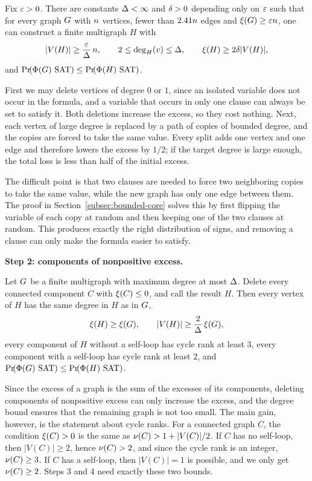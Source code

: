 \begin{lemma}\label{lem:overview-bounded-core}
Fix \(\varepsilon>0\). There are constants \(\Delta<\infty\) and \(\delta>0\)
depending only on \(\varepsilon\) such that for every graph \(G\) with
\(n\) vertices, fewer than \(2.41n\) edges and
\(\xi(G)\ge\varepsilon n\), one can construct a finite multigraph \(H\) with
\[
  |V(H)|\ge\frac{\varepsilon}{\Delta}\,n,
  \qquad
  2\le\deg_{H}(v)\le\Delta,
  \qquad
  \xi(H)\ge2\delta|V(H)|,
\]
and \(\Prx{\rform{\Gin}\SAT}\le\Prx{\rform{H}\SAT}\).
\end{lemma}

First we may delete vertices of degree \(0\) or \(1\), since an isolated
variable does not occur in the formula, and a variable that
occurs in only one clause can always be set to satisfy it. Both deletions
increase the excess, so they cost nothing. Next, each vertex of large degree is
replaced by a path of copies of bounded degree, and the copies are forced to
take the same value. Every split adds one vertex and one edge and therefore
lowers the excess by \(1/2\); if the target degree is large enough, the total
loss is less than half of the initial excess.

The difficult point is that two clauses are needed to force two neighboring
copies to take the same value, while the new graph has only one edge between
them. The proof in Section~\ref{subsec:bounded-core} solves this by first
flipping the variable of each copy at random and then keeping one of the two
clauses at random. This produces exactly the right distribution of signs, and
removing a clause can only make the formula easier to satisfy.

\medskip
\noindent\textbf{Step 2: components of nonpositive excess.}

\begin{lemma}\label{lem:overview-positive-components}
Let \(G\) be a finite multigraph with maximum degree at most \(\Delta\).
Delete every connected component \(C\) with \(\xi(C)\le0\), and call the
result \(H\). Then every vertex of \(H\) has the same degree in \(H\) as in
\(G\),
\[
  \xi(H)\ge\xi(G),
  \qquad
  |V(H)|\ge\frac{2}{\Delta}\,\xi(G),
\]
every component of \(H\) without a self-loop has cycle rank at least \(3\),
every component with a self-loop has cycle rank at least \(2\), and
\(\Prx{\rform{\Gin}\SAT}\le\Prx{\rform{H}\SAT}\).
\end{lemma}

Since the excess of a graph is the sum of the excesses of its components,
deleting components of nonpositive excess can only increase the excess, and the
degree bound ensures that the remaining graph is not too small. The main gain,
however, is the statement about cycle ranks. For a connected graph \(C\), the
condition \(\xi(C)>0\) is the same as \(\nu(C)>1+|V(C)|/2\). If \(C\) has no
self-loop, then \(|V(C)|\ge2\), hence \(\nu(C)>2\), and since the cycle rank is
an integer, \(\nu(C)\ge3\). If \(C\) has a self-loop, then \(|V(C)|=1\) is
possible, and we only get \(\nu(C)\ge2\). Steps 3 and 4 need exactly these
two bounds.

